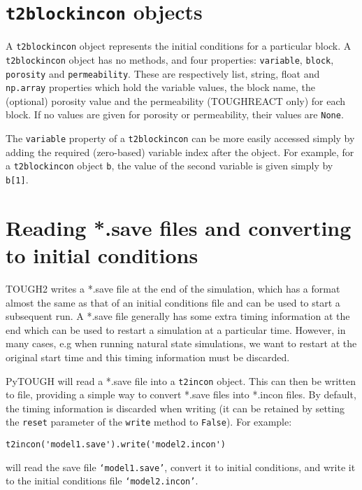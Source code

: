 \section{\texttt{t2blockincon} objects}
\label{t2blockincons}

A \texttt{t2blockincon} object represents the initial conditions for a particular block.  A \texttt{t2blockincon} object has no methods, and four properties: \texttt{variable}, \texttt{block}, \texttt{porosity} and \texttt{permeability}.  These are respectively list, string, float and \texttt{np.array} properties which hold the variable values, the block name, the (optional) porosity value and the permeability (TOUGHREACT only) for each block.  If no values are given for porosity or permeability, their values are \texttt{None}.

The \texttt{variable} property of a \texttt{t2blockincon} can be more easily accessed simply by adding the required (zero-based) variable index after the object.  For example, for a \texttt{t2blockincon} object \texttt{b}, the value of the second variable is given simply by \texttt{b[1]}.

\section{Reading *.save files and converting to initial conditions}

TOUGH2 writes a *.save file at the end of the simulation, which has a format almost the same as that of an initial conditions file and can be used to start a subsequent run.  A *.save file generally has some extra timing information at the end which can be used to restart a simulation at a particular time.  However, in many cases, e.g when running natural state simulations, we want to restart at the original start time and this timing information must be discarded.

PyTOUGH will read a *.save file into a \texttt{t2incon} object.  This can then be written to file, providing a simple way to convert *.save files into *.incon files.  By default, the timing information is discarded when writing (it can be retained by setting the \texttt{reset} parameter of the \texttt{write} method to \texttt{False}).  For example:

\begin{verbatim}
t2incon('model1.save').write('model2.incon')
\end{verbatim}

will read the save file \texttt{`model1.save'}, convert it to initial conditions, and write it to the initial conditions file \texttt{`model2.incon'}.


